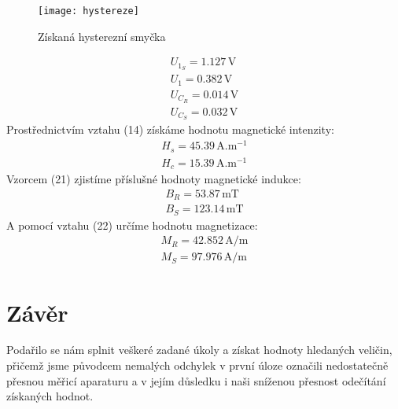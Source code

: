\documentclass[czech,11pt,a4paper]{article}
\begin{document}
\begin{multicols}{2}
\begin{figure}[H]
\begin{center}
 			\texttt{[image: hystereze]} 
 			\caption{Získaná hysterezní smyčka}
 		\end{center} 		
 	\end{figure} 
 	\begin{gather*}
 		U_{1_S} = 1.127 \,\mathrm{V}\\
 		U_{1} = 0.382 \,\mathrm{V}\\
 		U_{C_{R}} = 0.014 \,\mathrm{V}\\
 		U_{C_{S}} = 0.032 \,\mathrm{V} 		
 	\end{gather*} 	
 	Prostřednictvím vztahu (14) získáme hodnotu magnetické intenzity:
 	\begin{gather*}
 		H_s = 45.39\,\mathrm{A.m^{-1}}\\
 		H_c = 15.39\,\mathrm{A.m^{-1}}
 	\end{gather*}
 	Vzorcem (21) zjistíme příslušné hodnoty magnetické indukce:
 	\begin{gather*}
 		B_R = 53.87 \,\mathrm{mT}\\
 		B_S = 123.14 \,\mathrm{mT}
 	\end{gather*}
 	A pomocí vztahu (22) určíme hodnotu magnetizace:
 	\begin{gather*}
 		M_R = 42.852 \,\mathrm{A/m}\\
 		M_S = 97.976 \,\mathrm{A/m}
 	\end{gather*}
 	
	\section{Závěr}
	Podařilo se nám splnit veškeré zadané úkoly a získat hodnoty hledaných veličin, přičemž jsme původcem nemalých odchylek v první úloze označili nedostatečně přesnou měřicí aparaturu a v jejím důsledku i naši sníženou přesnost odečítání získaných hodnot.
	
	
	
	
	
	
	
	\end{multicols}
\end{document}
